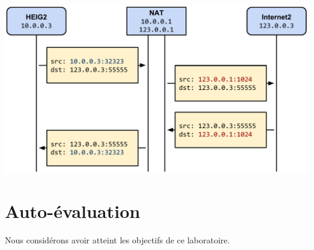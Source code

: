\documentclass[11pt,a4paper]{article}
\begin{document}
\begin{center}
\includegraphics[width=15cm]{img_nat}
\end{center}

\section{Auto-évaluation}

Nous considérons avoir atteint les objectifs de ce laboratoire.
\end{document}

